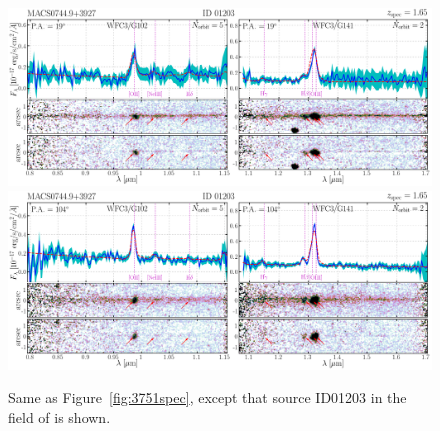 \begin{figure}
    \includegraphics[width=\textwidth]{fig/clM0744_id01203_pa019_ELfig.png}
    \includegraphics[width=\textwidth]{fig/clM0744_id01203_pa104_ELfig.png}
    \caption[Same as Figure~\ref{fig:3751spec}, except that source ID01203 in the field of \clba is shown.]
    {Same as Figure~\ref{fig:3751spec}, except that source ID01203 in the field of \clba is shown.}
    \label{fig:1203spec}
\end{figure}



